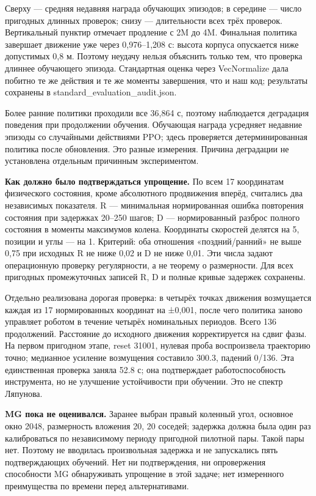 \documentclass[10pt,a4paper]{article}
\begin{document}
Сверху --- средняя недавняя награда обучающих эпизодов; в середине --- число пригодных длинных проверок; снизу --- длительности всех трёх проверок. Вертикальный пунктир отмечает продление с 2M до 4M. Финальная политика завершает движение уже через 0,976--1,208 с: высота корпуса опускается ниже допустимых 0,8 м. Поэтому неудачу нельзя объяснить только тем, что проверка длиннее обучающего эпизода. Стандартная оценка через VecNormalize дала побитно те же действия и те же моменты завершения, что и наш код; результаты сохранены в standard\_evaluation\_audit.json.

Более ранние политики проходили все 36,864 с, поэтому наблюдается деградация поведения при продолжении обучения. Обучающая награда усредняет недавние эпизоды со случайными действиями PPO; здесь проверяется детерминированная политика после обновления. Это разные измерения. Причина деградации не установлена отдельным причинным экспериментом.

\textbf{Как должно было подтверждаться упрощение.} По всем 17 координатам физического состояния, кроме абсолютного продвижения вперёд, считались два независимых показателя. R --- минимальная нормированная ошибка повторения состояния при задержках 20--250 шагов; D --- нормированный разброс полного состояния в моменты максимумов колена. Координаты скоростей делятся на 5, позиции и углы --- на 1. Критерий: оба отношения «поздний/ранний» не выше 0,75 при исходных R не ниже 0,02 и D не ниже 0,01. Эти числа задают операционную проверку регулярности, а не теорему о размерности. Для всех пригодных промежуточных записей R, D и полные кривые задержек сохранены.

Отдельно реализована дорогая проверка: в четырёх точках движения возмущается каждая из 17 нормированных координат на ±0,001, после чего политика заново управляет роботом в течение четырёх номинальных периодов. Всего 136 продолжений. Расстояние до исходного движения корректируется на сдвиг фазы. На первом пригодном этапе, reset 31001, нулевая проба воспроизвела траекторию точно; медианное усиление возмущения составило 300.3, падений 0/136. Эта единственная проверка заняла 52.8 с; она подтверждает работоспособность инструмента, но не улучшение устойчивости при обучении. Это не спектр Ляпунова.

\textbf{MG пока не оценивался.} Заранее выбран правый коленный угол, основное окно 2048, размерность вложения 20, 20 соседей; задержка должна была один раз калиброваться по независимому периоду пригодной пилотной пары. Такой пары нет. Поэтому не вводилась произвольная задержка и не запускались пять подтверждающих обучений. Нет ни подтверждения, ни опровержения способности MG обнаруживать упрощение в этой задаче; нет измеренного преимущества по времени перед альтернативами.
\end{document}

